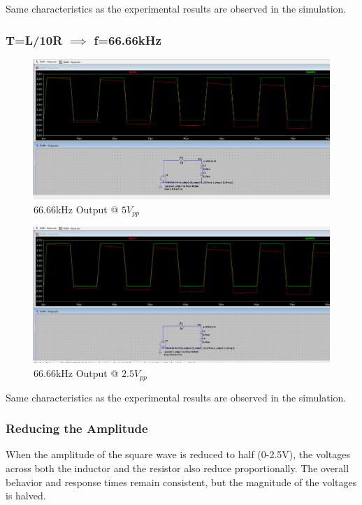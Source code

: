 Same characteristics as the experimental results are observed in the simulation.

\newpage{}
\thispagestyle{plain}

\subsubsection{T=L/10R $\implies$ f=66.66kHz}

\begin{figure}[h]
    \centering
    \includegraphics[width=1\textwidth]{assets/66666-hz-5vpp-sim.png}
    \caption{66.66kHz Output @ $5V_{pp}$}
    \label{fig:6666-hz-5vpp-output}
\end{figure}

\begin{figure}[h]
    \centering
    \includegraphics[width=1\textwidth]{assets/66666-hz-2.5vpp-sim.png}
    \caption{66.66kHz Output @ $2.5V_{pp}$}
    \label{fig:6666-hz-2.5vpp-output}
\end{figure}

Same characteristics as the experimental results are observed in the simulation.

\newpage{}
\thispagestyle{plain}

\subsubsection{Reducing the Amplitude}
When the amplitude of the square wave is reduced to half (0-2.5V), the voltages across both the inductor and the resistor also reduce proportionally. The overall behavior and response times remain consistent, but the magnitude of the voltages is halved.
